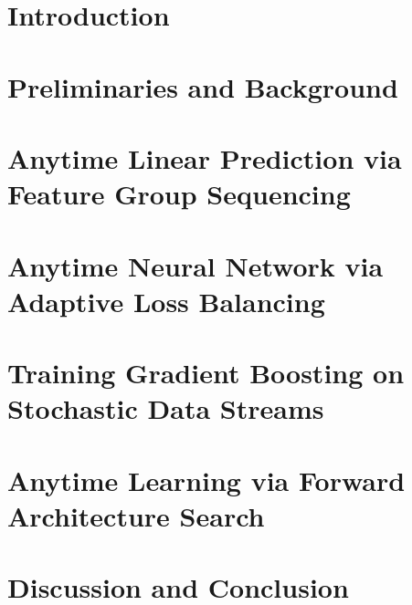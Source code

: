 \documentclass[review,12pt]{cmuthesis}
\newcommand{\GOMPDIR}{1_gomp}
\newcommand{\SGBDIR}{2_sgb}
\newcommand{\ANNDIR}{3_ann}
\newcommand{\NASDIR}{4_nas}
\begin{document}
 

\tableofcontents
\listoffigures
\listoftables

\mainmatter


\linenumbers
\chapter{Introduction}
\label{chapter:thesis_introduction}


\chapter{Preliminaries and Background}
\label{chapter:background}



\chapter{Anytime Linear Prediction via Feature Group Sequencing}
\label{chapter:anytime_linear}


\chapter{Anytime Neural Network via Adaptive Loss Balancing}
\label{chapter:ann}


\chapter{Training Gradient Boosting on Stochastic Data Streams}
\label{chapter:sgb}


\chapter{Anytime Learning via Forward Architecture Search}
\label{chapter:nas}



\chapter{Discussion and Conclusion}
\label{chapter:conclusion}




\end{document}
